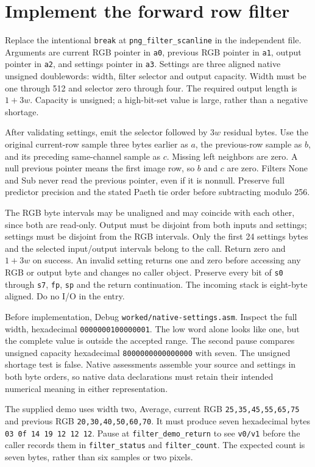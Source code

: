 \section{Implement the forward row filter}

Replace the intentional \texttt{break} at \texttt{png\_filter\_scanline} in
the independent file. Arguments are current RGB pointer in \texttt{a0}, previous
RGB pointer in \texttt{a1}, output pointer in \texttt{a2}, and settings pointer
in \texttt{a3}. Settings are three aligned native unsigned doublewords: width,
filter selector and output capacity. Width must be one through 512 and selector
zero through four. The required output length is $1+3w$. Capacity is unsigned;
a high-bit-set value is large, rather than a negative shortage.

After validating settings, emit the selector followed by $3w$ residual bytes.
Use the original current-row sample three bytes earlier as $a$, the previous-row
sample as $b$, and its preceding same-channel sample as $c$. Missing left
neighbors are zero. A null previous pointer means the first image row, so $b$
and $c$ are zero. Filters None and Sub never read the previous pointer, even
if it is nonnull. Preserve full predictor precision and the stated Paeth tie
order before subtracting modulo 256.

The RGB byte intervals may be unaligned and may coincide with each other,
since both are read-only. Output must be disjoint from both inputs and settings;
settings must be disjoint from the RGB intervals. Only the first 24 settings
bytes and the selected input/output intervals belong to the call. Return zero
and $1+3w$ on success. An invalid setting returns one and zero before accessing
any RGB or output byte and changes no caller object. Preserve every bit of
\texttt{s0} through \texttt{s7}, \texttt{fp}, \texttt{sp} and the return
continuation. The incoming stack is eight-byte aligned. Do no I/O in the entry.

Before implementation, Debug \texttt{worked/native-settings.asm}.
Inspect the full width, hexadecimal \texttt{0000000100000001}.
The low word alone looks like one, but the complete value is outside the accepted range. The second
pause compares unsigned capacity hexadecimal \texttt{8000000000000000}
with seven. The unsigned shortage test is false. Native assessments assemble
your source and settings in both byte orders, so native data declarations must
retain their intended numerical meaning in either representation.

The supplied demo uses width two, Average, current RGB
\texttt{25,35,45,55,65,75} and previous RGB \texttt{20,30,40,50,60,70}.
It must produce seven hexadecimal bytes
\texttt{03 0f 14 19 12 12 12}. Pause at \texttt{filter\_demo\_return} to see
\texttt{v0/v1} before the caller records them in \texttt{filter\_status} and
\texttt{filter\_count}. The expected count is seven bytes, rather than six
samples or two pixels.

